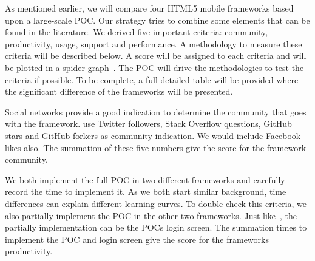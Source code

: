 \documentclass[a4paper]{artikel3}
\renewcommand{\paragraph}[1]{\vspace{2mm} \noindent {\bf #1}  }
\begin{document}

As mentioned earlier,  we will compare four HTML5 mobile frameworks based upon a large-scale POC.  
Our strategy tries to combine some elements that can be found in the literature.  
We derived five important criteria:  community,  productivity,  usage,  support and performance.  
A methodology to measure these criteria will be described below.  
A score will be assigned to each criteria and will be plotted in a spider graph~\cite{Few2005}.   
The POC will drive the methodologies to test the criteria if possible.  
To be complete,  a full detailed table will be provided where the significant difference of the frameworks will be presented. 	

\paragraph{Community}
Social networks provide a good indication to determine the community that goes with the framework.  
\cite{Sarrafi2012a,Ayuso2012} use Twitter followers,  Stack Overflow questions,  GitHub stars and GitHub forkers as community indication.  
We would include Facebook likes also.  The summation of these five numbers give the score for the framework community.  

\paragraph{Productivity}
We both implement the full POC in two different frameworks and carefully record the time to implement it.  
As we both start similar background,  time differences can explain different learning curves.  
To double check this criteria,  we also partially implement the POC in the other two frameworks.  
Just like~\cite{Burris},  the partially implementation can be the POCs login screen.  
The summation times to implement the POC and login screen give the score for the frameworks productivity.  
\end{document}
